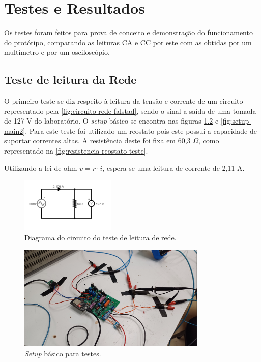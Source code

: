 
\chapter{Testes e Resultados}\label{cap:resultados}

Os testes foram feitos para prova de conceito e demonstração do funcionamento do protótipo, comparando as leituras \gls{CA} e \gls{CC} por este com as obtidas por um multímetro e por um osciloscópio.

\section{Teste de leitura da Rede}\label{sec:l-rede}

O primeiro teste se diz respeito à leitura da tensão e corrente de um circuito representado pela \autoref{fig:circuito-rede-falstad}, sendo o sinal a saída de uma tomada de 127 V do laboratório. O \textit{setup} básico se encontra nas figuras \ref{fig:setup-main} e \ref{fig:setup-main2}. Para este teste foi utilizado um reostato pois este possui a capacidade de suportar correntes altas. A resistência deste foi fixa em 60,3 $\Omega$, como representado na \autoref{fig:resistencia-reostato-teste}.

Utilizando a lei de ohm $v = r \cdot  i$, espera-se uma leitura de corrente de 2,11 A.

\begin{figure}[htb!]
    \caption{Diagrama do circuito do teste de leitura de rede.}
    \label{fig:circuito-rede-falstad}
    \includegraphics[width=0.4\textwidth]{figuras/circ-rede-falstad.png}
    \fonte{}
\end{figure}

\begin{figure}[htb!]
    \caption{\textit{Setup} básico para testes.}
    \label{fig:setup-main}
    \includegraphics[width=0.8\textwidth]{figuras/setup-basico.png}
    \fonte{}
\end{figure}

